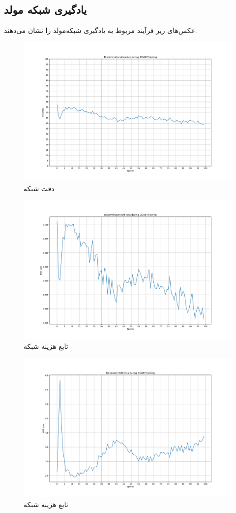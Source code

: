 \documentclass{article}
\begin{document}
\subsection{یادگیری شبکه مولد}
عکس‌‌های زیر فرآیند مربوط به یادگیری شبکه‌مولد را نشان می‌دهند.
\begin{figure}[H]
	\centerline{\includegraphics[width=\textwidth , height=0.5\textheight ]{../results/CGAN_Adam/figs/D_Accuracy}}
	\caption{دقت شبکه }
\end{figure}
\begin{figure}[H]
	\centerline{\includegraphics[width=\textwidth , height=0.5\textheight ]{../results/CGAN_Adam/figs/D_Loss}}
	\caption{تابع هزینه شبکه }
\end{figure}
\begin{figure}[H]
	\centerline{\includegraphics[width=\textwidth , height=0.5\textheight ]{../results/CGAN_Adam/figs/G_Loss}}
	\caption{تابع هزینه شبکه }
\end{figure}
\end{document}
